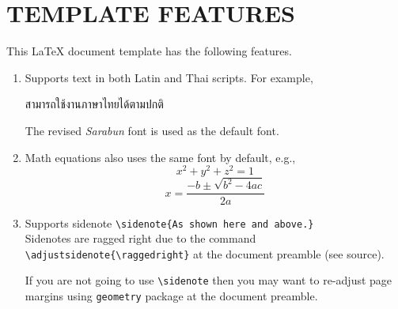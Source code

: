 
\section{TEMPLATE FEATURES}

This \LaTeX{} document template has the following features.

\begin{enumerate}

\item Supports text in both Latin and Thai scripts. For example,
    \begin{center}
        สามารถใช้งานภาษาไทยได้ตามปกติ
    \end{center}
    The revised \textit{Sarabun}
    font is used as the default font.

\item Math equations also uses the same font by default, e.g.,
    \begin{equation}
        x^2 + y^2 + z^2 = 1 \tag{3-Dimensional Sphere}
    \end{equation}
    \begin{equation}
        x = \frac{-b \pm \sqrt{b^2 - 4ac}}{2a} \tag{Quadratic Solution}
    \end{equation}

\item Supports sidenote \lstinline"\sidenote{As shown here and above.}" \\
    Sidenotes are ragged right due to the command \lstinline"\adjustsidenote{\raggedright}"
    at the document preamble (see source).

    If you are not going to use \lstinline"\sidenote" then you may want to 
    re-adjust page margins using \lstinline{geometry} package at the document preamble. 
    

\end{enumerate}

